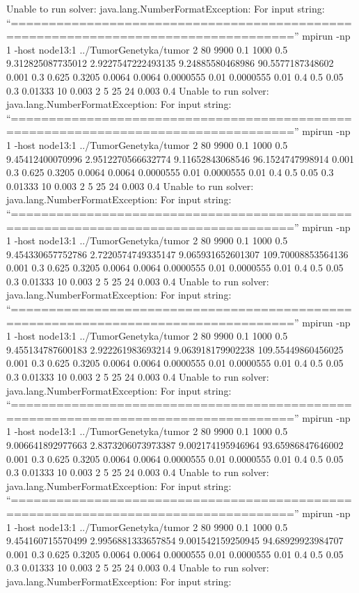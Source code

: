 \documentclass[]{article}
\begin{document}
Unable to run solver: java.lang.NumberFormatException: For input string:
``===================================================================================''
mpirun -np 1 -host node13:1 ../TumorGenetyka/tumor 2 80 9900 0.1 1000
0.5 9.312825087735012 2.9227547222493135 9.24885580468986
90.5577187348602 0.001 0.3 0.625 0.3205 0.0064 0.0064 0.0000555 0.01
0.0000555 0.01 0.4 0.5 0.05 0.3 0.01333 10 0.003 2 5 25 24 0.003 0.4
Unable to run solver: java.lang.NumberFormatException: For input string:
``===================================================================================''
mpirun -np 1 -host node13:1 ../TumorGenetyka/tumor 2 80 9900 0.1 1000
0.5 9.45412400070996 2.9512270566632774 9.11652843068546
96.1524747998914 0.001 0.3 0.625 0.3205 0.0064 0.0064 0.0000555 0.01
0.0000555 0.01 0.4 0.5 0.05 0.3 0.01333 10 0.003 2 5 25 24 0.003 0.4
Unable to run solver: java.lang.NumberFormatException: For input string:
``===================================================================================''
mpirun -np 1 -host node13:1 ../TumorGenetyka/tumor 2 80 9900 0.1 1000
0.5 9.454330657752786 2.7220574749335147 9.065931652601307
109.70008853564136 0.001 0.3 0.625 0.3205 0.0064 0.0064 0.0000555 0.01
0.0000555 0.01 0.4 0.5 0.05 0.3 0.01333 10 0.003 2 5 25 24 0.003 0.4
Unable to run solver: java.lang.NumberFormatException: For input string:
``===================================================================================''
mpirun -np 1 -host node13:1 ../TumorGenetyka/tumor 2 80 9900 0.1 1000
0.5 9.455134787600183 2.922261983693214 9.063918179902238
109.55449860456025 0.001 0.3 0.625 0.3205 0.0064 0.0064 0.0000555 0.01
0.0000555 0.01 0.4 0.5 0.05 0.3 0.01333 10 0.003 2 5 25 24 0.003 0.4
Unable to run solver: java.lang.NumberFormatException: For input string:
``===================================================================================''
mpirun -np 1 -host node13:1 ../TumorGenetyka/tumor 2 80 9900 0.1 1000
0.5 9.006641892977663 2.8373206073973387 9.002174195946964
93.65986847646002 0.001 0.3 0.625 0.3205 0.0064 0.0064 0.0000555 0.01
0.0000555 0.01 0.4 0.5 0.05 0.3 0.01333 10 0.003 2 5 25 24 0.003 0.4
Unable to run solver: java.lang.NumberFormatException: For input string:
``===================================================================================''
mpirun -np 1 -host node13:1 ../TumorGenetyka/tumor 2 80 9900 0.1 1000
0.5 9.454160715570499 2.9956881333657854 9.001542159250945
94.68929923984707 0.001 0.3 0.625 0.3205 0.0064 0.0064 0.0000555 0.01
0.0000555 0.01 0.4 0.5 0.05 0.3 0.01333 10 0.003 2 5 25 24 0.003 0.4
Unable to run solver: java.lang.NumberFormatException: For input string:
\end{document}
